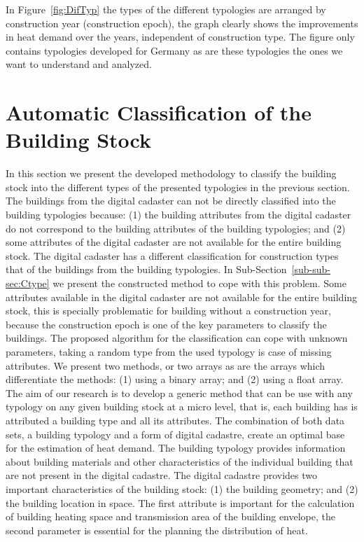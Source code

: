 In Figure~\ref{fig:DifTyp} the types of the different typologies are arranged by
construction year (construction epoch), the graph clearly shows the
improvements in heat demand over the years, independent of construction type.
The figure only contains typologies developed for Germany as are these
typologies the ones we want to understand and analyzed.\\



\section{Automatic Classification of the Building Stock}\label{sec:class}

In this section we present the developed methodology to classify the building
stock into the different types of the presented typologies in the previous
section. The buildings from the digital cadaster can not be directly
classified into the building typologies because: (1) the building attributes
from the digital cadaster do not correspond to the building attributes of the
building typologies; and (2) some attributes of the digital cadaster are not
available for the entire building stock.  The digital cadaster has a different
classification for construction types that of the buildings from the building
typologies. In Sub-Section~\ref{sub-sub-sec:Ctype} we present the constructed
method to cope with this problem. Some attributes available in the
digital cadaster are not available for the entire building stock, this is
specially problematic for building without a construction year, because the
construction epoch is one of the key parameters to classify the buildings.  The
proposed algorithm for the classification can cope with unknown parameters,
taking a random type from the used typology is case of missing attributes.  We
present two methods, or two arrays as are the arrays which differentiate the
methods: (1) using a binary array; and (2) using a float array.\\

The aim of our research is to develop a generic method that can be use with any
typology on any given building stock at a micro level, that is, each building
has is attributed a building type and all its attributes.  The combination of
both data sets, a building typology and a form of digital cadastre, create an
optimal base for the estimation of heat demand. The building typology provides
information about building materials and other characteristics of the
individual building that are not present in the digital cadastre. The digital
cadastre provides two important characteristics of the building stock: (1) the
building geometry; and (2) the building location in space.  The first attribute
is important for the calculation of building heating space and transmission
area of the building envelope, the second parameter is essential for the
planning the distribution of heat.\\

